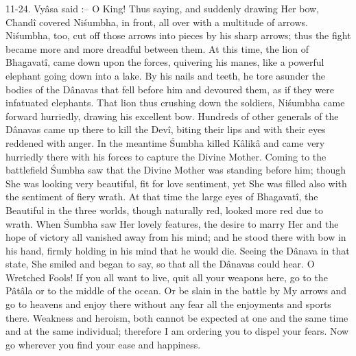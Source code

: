 11-24. Vy\^asa said :-- O King! Thus saying, and suddenly drawing Her bow, Chand\^i covered Ni\'sumbha, in front, all over with a multitude of arrows. Ni\'sumbha, too, cut off those arrows into pieces by his sharp arrows; thus the fight became more and more dreadful between them. At this time, the lion of Bhagavat\^i, came down upon the forces, quivering his manes, like a powerful elephant going down into a lake. By his nails and teeth, he tore asunder the bodies of the D\^anavas that fell before him and devoured them, as if they were infatuated elephants. That lion thus crushing down the soldiers, Ni\'sumbha came forward hurriedly, drawing his excellent bow. Hundreds of other generals of the D\^anavas came up there to kill the Dev\^i, biting their lips and with their eyes reddened with anger. In the meantime \'Sumbha killed K\^alik\^a and came very hurriedly there with his forces to capture the Divine Mother. Coming to the battlefield \'Sumbha saw that the Divine Mother was standing before him; though She was looking very beautiful, fit for love sentiment, yet She was filled also with the sentiment of fiery wrath. At that time the large eyes of Bhagavat\^i, the Beautiful in the three worlds, though naturally red, looked more red due to wrath. When \'Sumbha saw Her lovely features, the desire to marry Her and the hope of victory all vanished away from his mind; and he stood there with bow in his hand, firmly holding in his mind that he would die. Seeing the D\^anava in that state, She smiled and began to say, so that all the D\^anavas could hear. O Wretched Fools! If you all want to live, quit all your weapons here, go to the P\^at\^ala or to the middle of the ocean. Or be slain in the battle by My arrows and go to heavens and enjoy there without any fear all the enjoyments and sports there. Weakness and heroism, both cannot be expected at one and the same time and at the same individual; therefore I am ordering you to dispel your fears. Now go wherever you find your ease and happiness.


